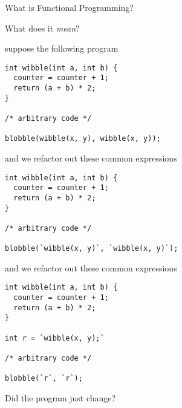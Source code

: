 \begin{frame}
\begin{center}
What is Functional Programming?
\end{center}
\begin{center}
What does it \emph{mean}?
\end{center}
\end{frame}

\begin{frame}[fragile]
\begin{block}{suppose the following program}
\begin{lstlisting}[style=java]
int wibble(int a, int b) {
  counter = counter + 1;
  return (a + b) * 2;
}

/* arbitrary code */

blobble(wibble(x, y), wibble(x, y));
\end{lstlisting}
\end{block}
\end{frame}

\begin{frame}[fragile]
\begin{block}{and we refactor out these common expressions}
\begin{lstlisting}[style=java]
int wibble(int a, int b) {
  counter = counter + 1;
  return (a + b) * 2;
}

/* arbitrary code */

blobble(`wibble(x, y)`, `wibble(x, y)`);
\end{lstlisting}
\end{block}
\end{frame}

\begin{frame}[fragile]
\begin{block}{and we refactor out these common expressions}
\begin{lstlisting}[style=java]
int wibble(int a, int b) {
  counter = counter + 1;
  return (a + b) * 2;
}

int r = `wibble(x, y);`

/* arbitrary code */

blobble(`r`, `r`);
\end{lstlisting}
\end{block}
\end{frame}

\begin{frame}[fragile]
\begin{center}
Did the program just change?
\end{center}
\end{frame}

